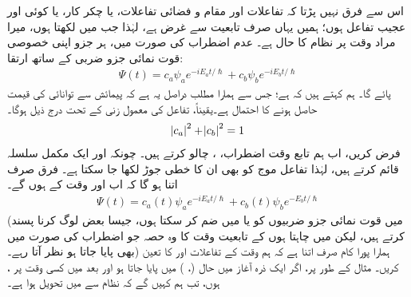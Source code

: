 اس سے فرق نہیں پڑتا کہ تفاعلات  اور  مقام و  فضائی تفاعلات،  یا چکر کار،  یا کوئی اور عجیب تفاعل ہوں؛ ہمیں یہاں صرف تابعیت    سے غرض ہے،  لہٰذا جب  میں  لکھتا ہوں،  میرا مراد وقت  پر نظام کا حال ہے۔ عدم اضطراب کی صورت میں،  ہر جزو  اپنی خصوصی قوت نمائی جزو  ضربی  کے ساتھ ارتقا:
\begin{align}
	\Psi(t)=c_a\psi_ae^{-iE_at/\hslash}+c_b\psi_be^{-iE_bt/\hslash}
\end{align}
پائے گا۔ ہم کہتے ہیں کہ    ہے؛ جس سے ہمارا   مطلب دراصل  یہ ہے کہ پیمائش سے  توانائی کی قیمت   حاصل ہونے کا احتمال  ہے۔یقیناً،  تفاعل  کی معمول زنی کے تحت درج ذیل ہوگا۔
\begin{align}\label{مساوات_تابع_مضطرب_معمول_زنی}
	\abs{c_a}^2+\abs{c_b}^2=1
\end{align}
 فرض کریں، اب  ہم تابع وقت اضطراب،  ،  چالو کرتے ہیں۔ چونکہ  اور  ایک مکمل سلسلہ  قائم   کرتے ہیں، لہٰذا تفاعل موج  کو بھی ان کا خطی جوڑ لکھا جا سکتا ہے۔ فرق صرف اتنا ہو گا کہ اب  اور  وقت  کے   ہوں گے۔
\begin{align}\label{مساوات_تابع_مضطرب_وقت}
	\Psi(t)=c_a(t)\psi_ae^{-iE_at/\hslash}+c_b(t)\psi_be^{-E_bt/\hslash}
\end{align}
(میں قوت نمائی  جزو  ضربیوں کو  یا  میں ضم کر سکتا ہوں، جیسا  بعض  لوگ کرنا پسند کرتے ہیں، لیکن میں چاہتا ہوں کے تابعیت وقت کا وہ حصہ جو   اضطراب کی   صورت میں بھی پایا جاتا ہو نظر آتا رہے۔)  ہمارا پورا کام صرف اتنا ہے کہ ہم وقت کے تفاعلات  اور  کا  تعین کریں۔ مثال کے طور پر،  اگر ایک ذرہ آغاز میں حال  
(، )  میں پایا جاتا ہو اور بعد میں کسی وقت  پر  ،  ہوں،  تب ہم کہیں گے کہ نظام  سے  میں  تحویل  ہوا ہے۔

